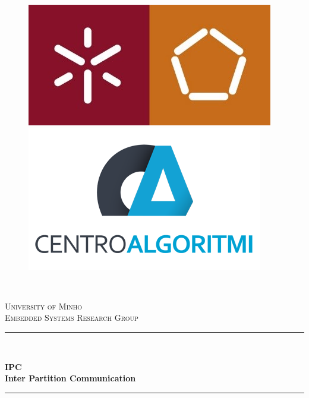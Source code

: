 \documentclass[
11pt, %
a4paper,
english,
onehalfspacing, %
]{article}
\begin{document}
\begin{titlepage}
	
	\newcommand{\HRule}{\rule{\linewidth}{0.5mm}} %
	
	\begin{center}
		\begin{figure}
		\centering
		\begin{minipage}{.5\textwidth}
		  \begin{flushleft}
		  \includegraphics[width=.4\linewidth]{Figures/EE}
		  \end{flushleft}
		\end{minipage}%
		\begin{minipage}{.5\textwidth}
		  \begin{flushright}
		  \includegraphics[width=.4\linewidth]{Figures/CA}
		  \end{flushright}
		\end{minipage}\\[1.5cm]
		\end{figure}
		

		\textsc{\LARGE University of Minho}\\[1cm] %
		\textsc{\Large Embedded Systems Research Group}\\[1cm] %
		
		\HRule \\[0.4cm] %
		{\huge \bfseries IPC \\ Inter Partition Communication\par}\vspace{0.4cm} %
		\HRule \\[2.5cm] %
		

\end{center}
\end{titlepage}
\end{document}
